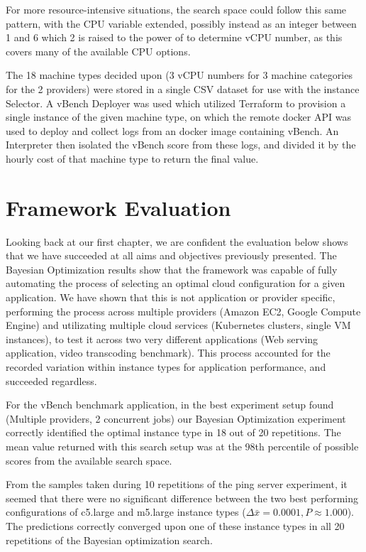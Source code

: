 \documentclass{report}
\begin{document}
For more resource-intensive situations, the search space could follow this same pattern, with the CPU variable extended, possibly instead as an integer between 1 and 6 which 2 is raised to the power of to determine vCPU number, as this covers many of the available CPU options.

The 18 machine types decided upon (3 vCPU numbers for 3 machine categories for the 2 providers) were stored in a single CSV dataset for use with the instance Selector. A vBench Deployer was used which utilized Terraform to provision a single instance of the given machine type, on which the remote docker API was used to deploy and collect logs from an docker image containing vBench. An Interpreter then isolated the vBench score from these logs, and divided it by the hourly cost of that machine type to return the final value.

\section{Framework Evaluation}
Looking back at our first chapter, we are confident the evaluation below shows that we have succeeded at all aims and objectives previously presented. The Bayesian Optimization results show that the framework was capable of fully automating the process of selecting an optimal cloud configuration for a given application. We have shown that this is not application or provider specific, performing the process across multiple providers (Amazon EC2, Google Compute Engine) and utilizating multiple cloud services (Kubernetes clusters, single VM instances), to test it across two very different applications (Web serving application, video transcoding benchmark). This process accounted for the recorded variation within instance types for application performance, and succeeded regardless. 

For the vBench benchmark application, in the best experiment setup found (Multiple providers, 2 concurrent jobs) our Bayesian Optimization experiment correctly identified the optimal instance type in 18 out of 20 repetitions. The mean value returned with this search setup was at the 98th percentile of possible scores from the available search space.

From the samples taken during 10 repetitions of the ping server experiment, it seemed that there were no significant difference between the two best performing configurations of c5.large and m5.large instance types ($\Delta \bar{x}=0.0001, P \approx 1.000$). The predictions correctly converged upon one of these instance types in all 20 repetitions of the Bayesian optimization search.
\end{document}
